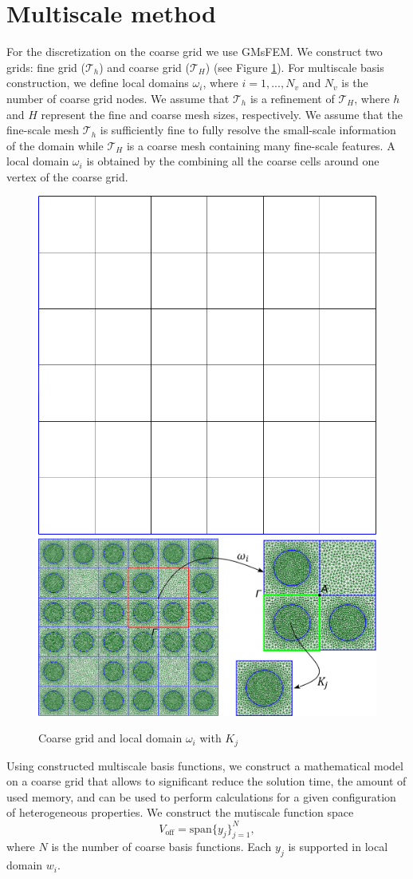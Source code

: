 \documentclass[runningheads]{llncs}
\begin{document}
\section{Multiscale method}
For the discretization on the coarse grid we use GMsFEM.
We construct two grids: fine grid ($\mathcal{T}_h$) and coarse grid ($\mathcal{T}_H$) (see Figure \ref{p1}). 
For multiscale basis construction, we define local domains $\omega_i$, where $i = 1,...,N_v$ and $N_v$ is the number of coarse grid nodes.
We assume that $\mathcal{T}_h$ is a refinement of $\mathcal{T}_H$, where $h$ and $H$ represent the fine and coarse mesh sizes, respectively. 
We assume that the fine-scale mesh $\mathcal{T}_h$ is sufficiently fine to fully resolve the small-scale information of the domain  while $\mathcal{T}_H$ is a coarse mesh containing many fine-scale features.
A local domain $\omega_i$ is obtained by the combining all the coarse cells around one vertex of the coarse grid. 

\begin{figure}[h!]
\centering
\includegraphics[width=0.26\linewidth]{coarse_grid.png}
\hspace{2em}
\includegraphics[width=0.5\linewidth]{omega_GA.png} 
\caption{Coarse grid and local domain $\omega_i$ with $K_j$}
\label{p1}
\end{figure} 

Using constructed multiscale basis functions, we construct a mathematical model on a coarse grid that allows to significant reduce the solution time, the amount of used memory, and can be used to perform calculations for a given configuration of  heterogeneous properties. 
We construct the mutiscale function space
\[
{V}_{\text{off}} = \mbox{span} \{ y_j \}_{j=1}^{N},
\]
where $N$ is the number of coarse basis functions.
Each $y_j$ is supported in local domain $w_i$.
\end{document}
